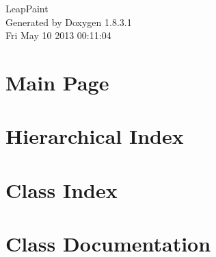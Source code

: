 \documentclass{article}
\begin{document}
\hypersetup{pageanchor=false,citecolor=blue}
\begin{titlepage}
\vspace*{7cm}
\begin{center}
{\Large Leap\-Paint }\\
\vspace*{1cm}
{\large Generated by Doxygen 1.8.3.1}\\
\vspace*{0.5cm}
{\small Fri May 10 2013 00:11:04}\\
\end{center}
\end{titlepage}
\tableofcontents
{}
\hypersetup{pageanchor=true,citecolor=blue}
\section{Main Page}
\label{index}\hypertarget{index}{}
\section{Hierarchical Index}

\section{Class Index}

\section{Class Documentation}




























\printindex
\end{document}
